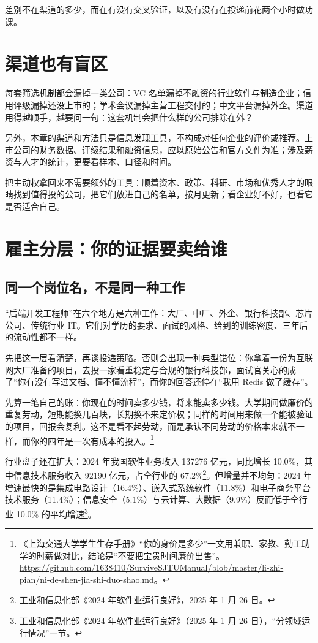 \documentclass[UTF8,zihao=5,openany]{ctexbook}
\begin{document}
差别不在渠道的多少，而在有没有交叉验证，以及有没有在投递前花两个小时做功课。

\section{渠道也有盲区}
\begin{warningbox}
每套筛选机制都会漏掉一类公司：VC 名单漏掉不融资的行业软件与制造企业；信用评级漏掉还没上市的；学术会议漏掉主营工程交付的；中文平台漏掉外企。渠道用得越顺手，越要问一句：这套机制会把什么样的公司排除在外？
\end{warningbox}

另外，本章的渠道和方法只是信息发现工具，不构成对任何企业的评价或推荐。上市公司的财务数据、评级结果和融资信息，应以原始公告和官方文件为准；涉及薪资与人才的统计，更要看样本、口径和时间。

把主动权拿回来不需要额外的工具：顺着资本、政策、科研、市场和优秀人才的眼睛找到值得投的公司，把它们放进自己的名单，按月更新；看企业好不好，也看它是否适合自己。

\section{雇主分层：你的证据要卖给谁}
\subsection{同一个岗位名，不是同一种工作}
“后端开发工程师”在六个地方是六种工作：大厂、中厂、外企、银行科技部、芯片公司、传统行业 IT。它们对学历的要求、面试的风格、给到的训练密度、三年后的流动性都不一样。

先把这一层看清楚，再谈投递策略。否则会出现一种典型错位：你拿着一份为互联网大厂准备的项目，去投一家看重稳定与合规的银行科技部，面试官关心的成了“你有没有写过文档、懂不懂流程”，而你的回答还停在“我用 Redis 做了缓存”。

先算一笔自己的账：你现在的时间卖多少钱，将来能卖多少钱。大学期间做廉价的重复劳动，短期能换几百块，长期换不来定价权；同样的时间用来做一个能被验证的项目，回报会复利。这不是看不起劳动，而是承认不同劳动的价格本来就不一样，而你的四年是一次有成本的投入。\footnote{《上海交通大学学生生存手册》“你的身价是多少”一文用兼职、家教、勤工助学的时薪做对比，结论是“不要把宝贵时间廉价出售”。\url{https://github.com/1638410/SurviveSJTUManual/blob/master/li-zhi-pian/ni-de-shen-jia-shi-duo-shao.md}。}

行业盘子还在扩大：2024 年我国软件业务收入 137276 亿元，同比增长 10.0\%，其中信息技术服务收入 92190 亿元，占全行业的 67.2\%\footnote{工业和信息化部《2024 年软件业运行良好》，2025 年 1 月 26 日。}。但增量并不均匀：2024 年增速最快的是集成电路设计（16.4\%）、嵌入式系统软件（11.8\%）和电子商务平台技术服务（11.4\%）；信息安全（5.1\%）与云计算、大数据（9.9\%）反而低于全行业 10.0\% 的平均增速\footnote{工业和信息化部《2024 年软件业运行良好》（2025 年 1 月 26 日），“分领域运行情况”一节。}。
\end{document}

